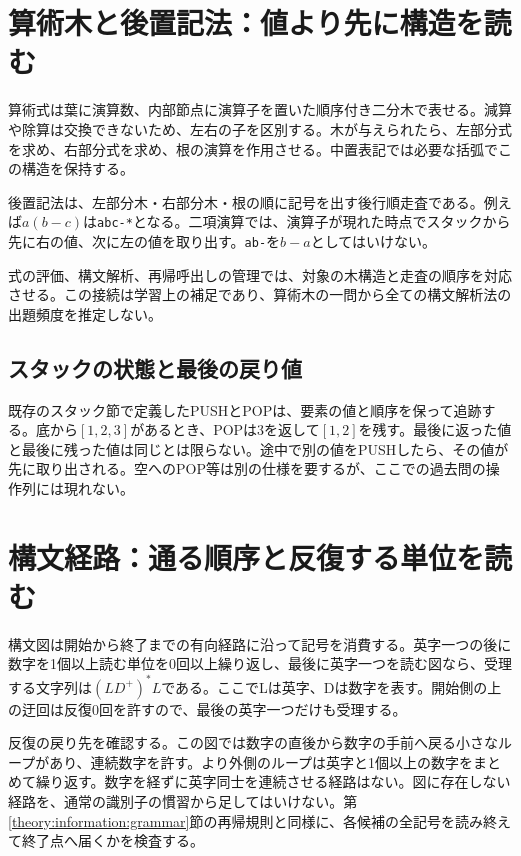 \section{算術木と後置記法：値より先に構造を読む}
\label{theory:discrete:expression}
算術式は葉に演算数、内部節点に演算子を置いた順序付き二分木で表せる。減算や除算は交換できないため、左右の子を区別する。木が与えられたら、左部分式を求め、右部分式を求め、根の演算を作用させる。中置表記では必要な括弧でこの構造を保持する。

後置記法は、左部分木・右部分木・根の順に記号を出す後行順走査である。例えば\(a(b-c)\)は\texttt{abc-*}となる。二項演算では、演算子が現れた時点でスタックから先に右の値、次に左の値を取り出す。\texttt{ab-}を\(b-a\)としてはいけない。

\begin{tcolorbox}[title=情報工学への接続]
式の評価、構文解析、再帰呼出しの管理では、対象の木構造と走査の順序を対応させる。この接続は学習上の補足であり、算術木の一問から全ての構文解析法の出題頻度を推定しない。
\end{tcolorbox}

\subsection{スタックの状態と最後の戻り値}
\label{theory:discrete:stack}
既存のスタック節で定義したPUSHとPOPは、要素の値と順序を保って追跡する。底から\([1,2,3]\)があるとき、POPは3を返して\([1,2]\)を残す。最後に返った値と最後に残った値は同じとは限らない。途中で別の値をPUSHしたら、その値が先に取り出される。空へのPOP等は別の仕様を要するが、ここでの過去問の操作列には現れない。

\section{構文経路：通る順序と反復する単位を読む}
\label{theory:discrete:syntax}
構文図は開始から終了までの有向経路に沿って記号を消費する。英字一つの後に数字を1個以上読む単位を0回以上繰り返し、最後に英字一つを読む図なら、受理する文字列は\((LD^+)^*L\)である。ここでLは英字、Dは数字を表す。開始側の上の迂回は反復0回を許すので、最後の英字一つだけも受理する。

反復の戻り先を確認する。この図では数字の直後から数字の手前へ戻る小さなループがあり、連続数字を許す。より外側のループは英字と1個以上の数字をまとめて繰り返す。数字を経ずに英字同士を連続させる経路はない。図に存在しない経路を、通常の識別子の慣習から足してはいけない。第\ref{theory:information:grammar}節の再帰規則と同様に、各候補の全記号を読み終えて終了点へ届くかを検査する。

